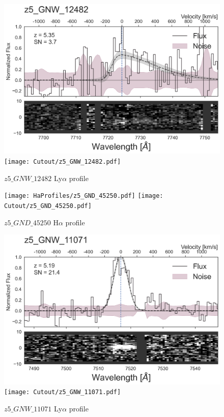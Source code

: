 \documentclass[12pt,english]{article}
\begin{document}
\clearpage
\begin{figure}
\begin{center}\includegraphics[width=12cm, trim=0.1cm 0cm 0cm -1cm]{LyaProfiles/z5_GNW_12482.png}
\texttt{[image: Cutout/z5\_GNW\_12482.pdf]}
\caption{$z5\_GNW\_12482$ Ly$\alpha$ profile}
\end{center}
\end{figure}
\clearpage
\begin{figure}
\begin{center}\texttt{[image: HaProfiles/z5\_GND\_45250.pdf]}
\texttt{[image: Cutout/z5\_GND\_45250.pdf]}
\caption{$z5\_GND\_45250$ H$\alpha$ profile}
\end{center}
\end{figure}
\clearpage
\begin{figure}
\begin{center}\includegraphics[width=12cm, trim=0.1cm 0cm 0cm -1cm]{LyaProfiles/z5_GNW_11071.png}
\texttt{[image: Cutout/z5\_GNW\_11071.pdf]}
\caption{$z5\_GNW\_11071$ Ly$\alpha$ profile}
\end{center}
\end{figure}
\end{document}
